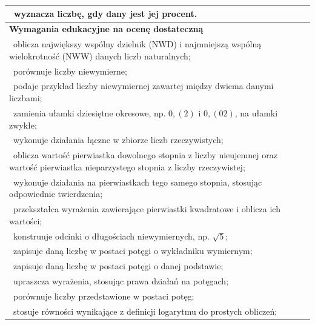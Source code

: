\documentclass[12pt,a4paper]{article}
\begin{document}
\begin{longtable}{|p{16cm}|}
		\textbullet\ wyznacza liczbę, gdy dany jest jej procent. \\ \hline
		
		\textbf{Wymagania edukacyjne na ocenę dostateczną} \\ \hline
		
		\textbullet\ oblicza największy wspólny dzielnik (NWD) i najmniejszą wspólną wielokrotność (NWW) danych liczb naturalnych; \\
		
		\textbullet\ porównuje liczby niewymierne; \\
		
		\textbullet\ podaje przykład liczby niewymiernej zawartej między dwiema danymi liczbami; \\
		
		\textbullet\ zamienia ułamki dziesiętne okresowe, np. $0,(2)$ i $0,(02)$, na ułamki zwykłe; \\
		
		\textbullet\ wykonuje działania łączne w zbiorze liczb rzeczywistych; \\
		
		\textbullet\ oblicza wartość pierwiastka dowolnego stopnia z liczby nieujemnej oraz wartość pierwiastka nieparzystego stopnia z liczby rzeczywistej; \\
		
		\textbullet\ wykonuje działania na pierwiastkach tego samego stopnia, stosując odpowiednie twierdzenia; \\
		
		\textbullet\ przekształca wyrażenia zawierające pierwiastki kwadratowe i oblicza ich wartości; \\
		
		\textbullet\ konstruuje odcinki o długościach niewymiernych, np. $\sqrt{5}$; \\
		
		\textbullet\ zapisuje daną liczbę w postaci potęgi o wykładniku wymiernym; \\
		
		\textbullet\ zapisuje daną liczbę w postaci potęgi o danej podstawie; \\
		
		\textbullet\ upraszcza wyrażenia, stosując prawa działań na potęgach; \\
		
		\textbullet\ porównuje liczby przedstawione w postaci potęg; \\
		
		\textbullet\ stosuje równości wynikające z definicji logarytmu do prostych obliczeń; \\
		

\end{longtable}
\end{document}
